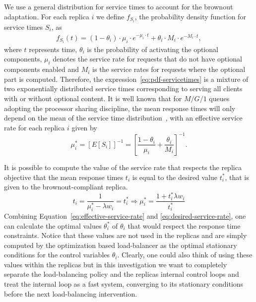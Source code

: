 We use a general distribution for service times to account for the
brownout adaptation. For each replica $i$ we define $f_{S_i}$, the
probability density function for service times $S_i$, as
\begin{align}
  f_{S_i} (t) = (1 - \theta_i) \cdot \mu_i \cdot e^{-\mu_i \cdot t} +
  \theta_i \cdot M_i \cdot e^{-M_i \cdot t} ,
\label{eq:pdf-servicetimes}
\end{align}
where $t$ represents time, $\theta_i$ is the probability of activating
the optional components, $\mu_i$ denotes the service rate for requests
that do not have optional components enabled and $M_i$ is the service
rates for requests where the optional part is computed. Therefore, the
expression~\eqref{eq:pdf-servicetimes} is a mixture of two
exponentially distributed service times corresponding to serving all
clients with or without optional content. It is well known that for
$M/G/1$ queues adopting the processor sharing discipline, the mean
response times will only depend on the mean of the service time
distribution~\cite{kleinrock67,sakata71}, with an effective service
rate for each replica $i$ given by
\begin{equation}
  \mu_i^* = \left[ E[S_i] \right]^{-1} = \left[ \frac{1-\theta_i}{\mu_i}
    + \frac{\theta_i}{M_i} \right]^{-1} .
  \label{eq:effective-service-rate}
\end{equation}

It is possible to compute the value of the service rate that respects
the replica objective that the mean response times $t_i$ is equal to
the desired value $t_i^*$, that is given to the brownout-compliant
replica.
\begin{equation}
  t_i = \frac{1}{\mu_i^*-\lambda w_i} = t_i^*
  \Longrightarrow \mu_i^* = \frac{1+t_i^*\lambda w_i}{t_i^*} 
  \label{eq:desired-service-rate}
\end{equation}
Combining Equation~\eqref{eq:effective-service-rate} and
\eqref{eq:desired-service-rate}, one can calculate the optimal values
$\theta_i^*$ of $\theta_i$ that would respect the response time
constraints.  Notice that these values are not used in the replicas
and are simply computed by the optimization based load-balancer as the
optimal stationary conditions for the control variables
$\theta_i$. Clearly, one could also think of using these values within
the replicas but in this investigation we want to completely separate
the load-balancing policy and the replicas internal control loops and
treat the internal loop as a fast system, converging to its stationary
conditions before the next load-balancing intervention.

